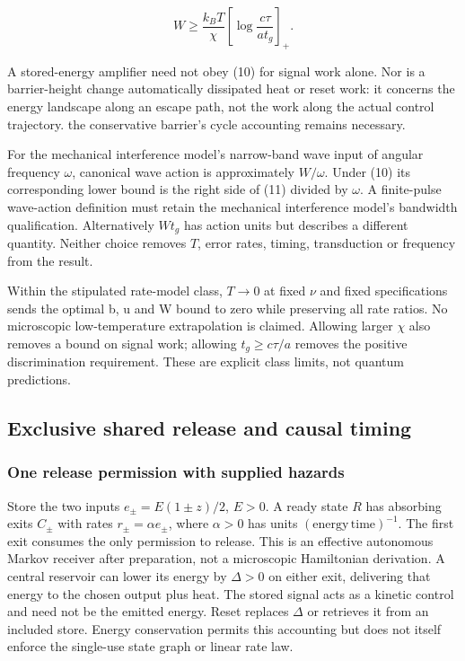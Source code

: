 \documentclass[11pt,a4paper]{article}
\begin{document}
\[W\ge\frac{k_BT}{\chi}
 \left[\log\frac{c\tau}{a t_g}\right]_+. \tag{11}\]

A stored-energy amplifier need not obey (10) for signal work alone. Nor
is a barrier-height change automatically dissipated heat or reset work:
it concerns the energy landscape along an escape path, not the work
along the actual control trajectory. the conservative barrier's cycle
accounting remains necessary.

For the mechanical interference model's narrow-band wave input of
angular frequency \(\omega\), canonical wave action is approximately
\(W/\omega\). Under (10) its corresponding lower bound is the right side
of (11) divided by \(\omega\). A finite-pulse wave-action definition
must retain the mechanical interference model's bandwidth qualification.
Alternatively \(Wt_g\) has action units but describes a different
quantity. Neither choice removes \(T\), error rates, timing,
transduction or frequency from the result.

Within the stipulated rate-model class, \(T\to0\) at fixed \(\nu\) and
fixed specifications sends the optimal b, u and W bound to zero while
preserving all rate ratios. No microscopic low-temperature extrapolation
is claimed. Allowing larger \(\chi\) also removes a bound on signal
work; allowing \(t_g\ge c\tau/a\) removes the positive discrimination
requirement. These are explicit class limits, not quantum predictions.

\hypertarget{exclusive-shared-release-and-causal-timing}{%
\subsection{Exclusive shared release and causal
timing}\label{exclusive-shared-release-and-causal-timing}}

\hypertarget{one-release-permission-with-supplied-hazards}{%
\subsubsection{One release permission with supplied
hazards}\label{one-release-permission-with-supplied-hazards}}

Store the two inputs \(e_\pm=E(1\pm z)/2\), \(E>0\). A ready state \(R\)
has absorbing exits \(C_\pm\) with rates \(r_\pm=\alpha e_\pm\), where
\(\alpha>0\) has units \((\mathrm{energy}\,\mathrm{time})^{-1}\). The
first exit consumes the only permission to release. This is an effective
autonomous Markov receiver after preparation, not a microscopic
Hamiltonian derivation. A central reservoir can lower its energy by
\(\Delta>0\) on either exit, delivering that energy to the chosen output
plus heat. The stored signal acts as a kinetic control and need not be
the emitted energy. Reset replaces \(\Delta\) or retrieves it from an
included store. Energy conservation permits this accounting but does not
itself enforce the single-use state graph or linear rate law.
\end{document}
